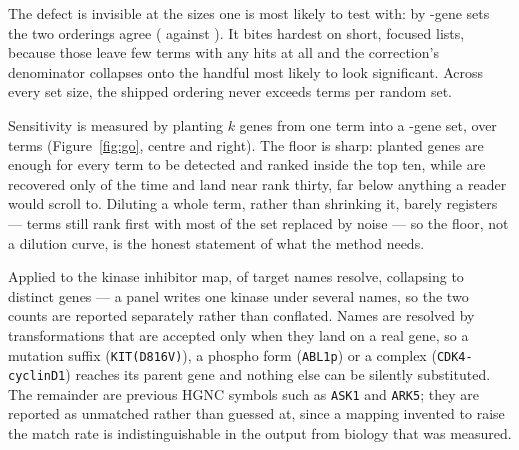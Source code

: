 The defect is invisible at the sizes one is most likely to test with: by
\goLargeSet{}-gene sets the two orderings agree (\goLargeBad{} against
\goLargeGood{}). It bites hardest on short, focused lists, because those leave few
terms with any hits at all and the correction's denominator collapses onto the
handful most likely to look significant. Across every set size, the shipped
ordering never exceeds \goWorstGood{} terms per random set.

Sensitivity is measured by planting $k$ genes from one term into a
\goStudySize{}-gene set, over \goPlantedTerms{} terms (Figure~\ref{fig:go}, centre
and right). The floor is sharp: \goFloorK{} planted genes are enough for every
term to be detected and ranked inside the top ten, while \goLowK{} are recovered
only \goLowRate{} of the time and land near rank thirty, far below anything a
reader would scroll to. Diluting a whole term, rather than shrinking it, barely
registers --- terms still rank first with most of the set replaced by noise --- so
the floor, not a dilution curve, is the honest statement of what the method needs.

Applied to the kinase inhibitor map, \goTargetsResolvedNames{} of
\goTargetsTotal{} target names resolve, collapsing to \goTargetsMatched{} distinct
genes --- a panel writes one kinase under several names, so the two counts are
reported separately rather than conflated. Names are resolved by transformations
that are accepted only when they land on a real gene, so a mutation suffix
(\texttt{KIT(D816V)}), a phospho form (\texttt{ABL1p}) or a complex
(\texttt{CDK4-cyclinD1}) reaches its parent gene and nothing else can be silently
substituted. The remainder are previous HGNC symbols such as \texttt{ASK1} and
\texttt{ARK5}; they are reported as unmatched rather than guessed at, since a
mapping invented to raise the match rate is indistinguishable in the output from
biology that was measured.
